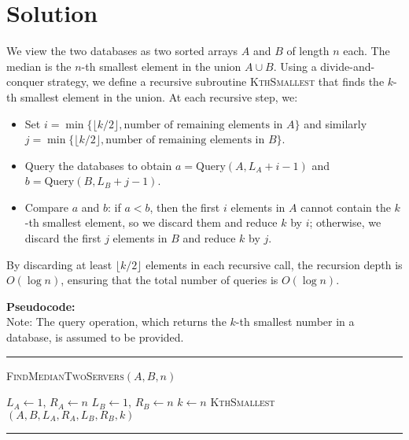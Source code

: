 \documentclass[11pt]{article}
\begin{document}
    \section*{Solution}
    We view the two databases as two sorted arrays \( A \) and \( B \) of length \( n \) each. The median is the \( n \)-th smallest element in the union \( A \cup B \). Using a divide-and-conquer strategy, we define a recursive subroutine \textsc{KthSmallest} that finds the \( k \)-th smallest element in the union. At each recursive step, we:
    \begin{itemize}
        \item Set \( i = \min\{ \lfloor k/2 \rfloor, \text{number of remaining elements in } A \} \) and similarly \( j = \min\{ \lfloor k/2 \rfloor, \text{number of remaining elements in } B \} \).
        \item Query the databases to obtain \( a = \text{Query}(A, L_A + i - 1) \) and \( b = \text{Query}(B, L_B + j - 1) \).
        \item Compare \( a \) and \( b \): if \( a < b \), then the first \( i \) elements in \( A \) cannot contain the \( k \)-th smallest element, so we discard them and reduce \( k \) by \( i \); otherwise, we discard the first \( j \) elements in \( B \) and reduce \( k \) by \( j \).
    \end{itemize}
    By discarding at least \(\lfloor k/2 \rfloor\) elements in each recursive call, the recursion depth is \( O(\log n) \), ensuring that the total number of queries is \( O(\log n) \).
    
    \bigskip
    
    \textbf{Pseudocode:} \\
    Note: The query operation, which returns the \( k \)-th smallest number in a database, is assumed to be provided.
    
    \par\noindent\rule{\textwidth}{0.4pt}
    \smallskip        
    \textsc{FindMedianTwoServers}$(A, B, n)$
    \begin{algorithmic}[1]
        \STATE $L_A \gets 1$, $R_A \gets n$
        \STATE $L_B \gets 1$, $R_B \gets n$
        \STATE $k \gets n$
        \RETURN \textsc{KthSmallest}$(A, B, L_A, R_A, L_B, R_B, k)$
    \end{algorithmic}
    \vspace{-2mm}
    \par\noindent\rule{\textwidth}{0.4pt}
    
    \bigskip
    
\end{document}
